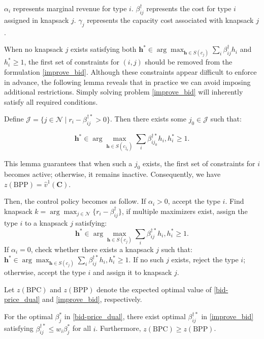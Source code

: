 $\alpha_{i}$ represents marginal revenue for type $i$. $\beta_{ij}^{\dag}$ represents the cost for type $i$ assigned in knapsack $j$. $\gamma_{j}$ represents the capacity cost associated with knapsack $j$.

When no knapsack $j$ exists satisfying both $\bm{h}^{*} \in \arg\max_{\bm{h} \in S(c_j)} \sum_{i} \beta_{ij}^{\dag} h_{i}$ and $h_{i}^{*} \geq 1$, the first set of constraints for $(i,j)$ should be removed from the formulation \eqref{improve_bid}. Although these constraints appear difficult to enforce in advance, the following lemma reveals that in practice we can avoid imposing additional restrictions. Simply solving problem \eqref{improve_bid} will inherently satisfy all required conditions.


\begin{lem}\label{BPP}
Define $\mathcal{J} = \{j \in \mathcal{N} \mid r_i - \beta_{ij}^{\dag *} > 0\}$. Then there exists some $j_0 \in \mathcal{J}$ such that:

$$\bm{h}^{*} \in \arg\max_{\bm{h} \in S(c_{j_0})} \sum_{i} \beta_{ij_0}^{\dag *} h_{i}, h_{i}^{*} \geq 1.$$
\end{lem}

This lemma guarantees that when such a $j_0$ exists, the first set of constraints for $i$ becomes active; otherwise, it remains inactive. Consequently, we have $z(\text{BPP}) = \hat{v}^{1}(\bm{C})$.

Then, the control policy becomes as follow. If $\alpha_{i} > 0$, accept the type $i$. Find knapsack $k = \arg \max_{j \in \mathcal{N}}\{r_i - \beta_{ij}^{\dag}\}$, if multiple maximizers exist, assign the type $i$ to a knapsack $j$ satisfying: $$\bm{h}^{*} \in \arg\max_{\bm{h} \in S(c_j)} \sum_{i} \beta_{ij}^{\dag *} h_{i}, h_{i}^{*} \geq 1.$$ If $\alpha_{i} = 0$, check whether there exists a knapsack $j$ such that: $\bm{h}^{*} \in \arg\max_{\bm{h} \in S(c_j)} \sum_{i} \beta_{ij}^{\dag *} h_{i}, h_{i}^{*} \geq 1$. If no such $j$ exists, reject the type $i$; otherwise, accept the type $i$ and assign it to knapsack $j$.

Let $z(\text{BPC})$ and $z(\text{BPP})$ denote the expected optimal value of \eqref{bid-price_dual} and \eqref{improve_bid}, respectively.

\begin{lem}\label{BPC_relation}
    For the optimal $\beta_{j}^{*}$ in \eqref{bid-price_dual}, there exist optimal $\beta_{ij}^{\dag *}$ in \eqref{improve_bid} satisfying $\beta_{ij}^{\dag *} \leq w_{i} \beta_{j}^{*}$ for all $i$. Furthermore, $z(\text{BPC}) \geq z(\text{BPP})$.
\end{lem}
    
